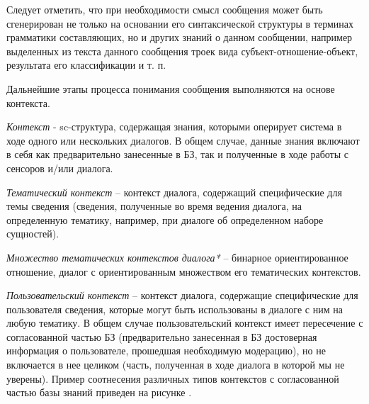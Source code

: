 Следует отметить, что при необходимости смысл сообщения может быть сгенерирован не только на основании его синтаксической структуры в терминах грамматики составляющих, но и других знаний о данном сообщении, например выделенных из текста данного сообщения троек вида субъект-отношение-объект, результата его классификации и т. п.

Дальнейшие этапы процесса понимания сообщения выполняются на основе контекста.

\textit{Контекст} - sc-структура, содержащая знания, которыми оперирует система в ходе одного или нескольких диалогов.
В общем случае, данные знания включают в себя как предварительно занесенные в БЗ, так и полученные в ходе работы с сенсоров и/или диалога.

\begin{SCn}

    \begin{scnindent}
        \begin{scneqtoset}
        \end{scneqtoset}
    \end{scnindent}

\end{SCn}

\textit{Тематический контекст} -- контекст диалога, содержащий специфические для темы сведения (сведения, полученные во время ведения диалога, на определенную тематику, например, при диалоге об определенном наборе сущностей).

\textit{Множество тематических контекстов диалога*} -- бинарное ориентированное отношение, диалог с ориентированным множеством его тематических контекстов.

\textit{Пользовательский контекст} -- контекст диалога, содержащие специфические для пользователя сведения, которые могут быть использованы в диалоге с ним на любую тематику. В общем случае пользовательский контекст имеет пересечение с согласованной частью БЗ (предварительно занесенная в БЗ достоверная информация о пользователе, прошедшая необходимую модерацию), но не включается в нее целиком (часть, полученная в ходе диалога в которой мы не уверены).
Пример соотнесения различных типов контекстов с согласованной частью базы знаний приведен на рисунке \textit{}.


